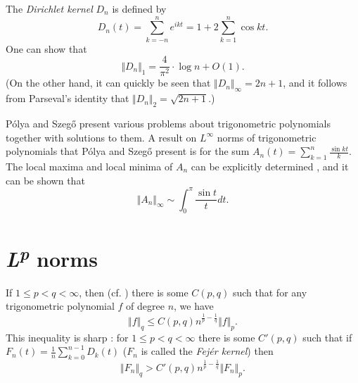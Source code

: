 \documentclass{article}
\newcommand{\norm}[1]{\Vert #1 \Vert}
\theoremstyle{definition}
\begin{document}
The {\em Dirichlet kernel} $D_n$ is defined by
\[
D_n(t)=\sum_{k=-n}^n e^{ikt}=1+2\sum_{k=1}^n \cos kt.
\]
One can show \cite[p.~71, Exercise 1.1]{katznelson} that
\[
\norm{D_n}_1 = \frac{4}{\pi^2}\cdot \log n+O(1).
\]
(On the other hand, it can quickly be seen that $\norm{D_n}_\infty=2n+1$, and it follows from Parseval's identity that
$\norm{D_n}_2=\sqrt{2n+1}$.)

P\'olya and Szeg{\H o} \cite[Part VI]{polya} present various problems about trigonometric polynomials together  with solutions to them.
A result on $L^\infty$ norms of trigonometric polynomials that P\'olya and Szeg{\H o} present is for the sum $A_n(t)=\sum_{k=1}^n \frac{\sin kt}{k}$. The local maxima and local minima of $A_n$ can be
explicitly determined \cite[p.~74, no.~23]{polya}, and 
it can be shown that \cite[p.~74, no.~25]{polya}
\[
\norm{A_n}_\infty \sim
\int_0^\pi \frac{\sin t}{t} dt.
\]

\section{{\em L}\textsuperscript{{\em p}} norms}
If $1 \leq p < q < \infty$, then  \cite[p.~123, Exercise~1.8]{katznelson} (cf. \cite[p.~102, Theorem 2.6]{devore}) there is some $C(p,q)$ such that for any trigonometric polynomial $f$ of degree $n$, we
have
\[
\norm{f}_q \leq C(p,q) n^{\frac{1}{p}-\frac{1}{q}} \norm{f}_p.
\]
This inequality is sharp  \cite[p.~230]{timan}: for $1 \leq p < q < \infty$ there is some $C'(p,q)$ such that
if $F_n(t)=\frac{1}{n}\sum_{k=0}^{n-1}D_k(t)$ ($F_n$ is called the {\em Fej\'er kernel})  then
\[
\norm{F_n}_q > C'(p,q) n^{\frac{1}{p}-\frac{1}{q}} \norm{F_n}_p.
\]
\end{document}
